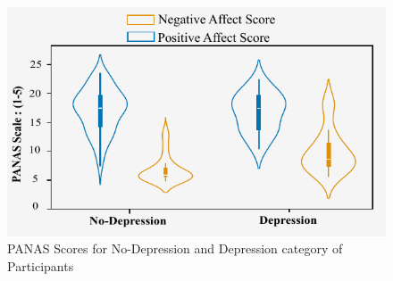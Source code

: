\documentclass{Interspeech2024}
\begin{document}




\begin{figure}[htbp]
    \centering
    \includegraphics[width=1.0\linewidth]{PANAS_gray.pdf}
    \caption{PANAS Scores for No-Depression and Depression category of Participants }
    \label{diagram1}
\end{figure}
\end{document}
